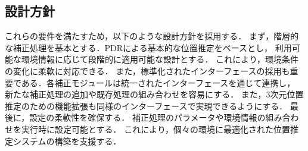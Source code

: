\subsection{設計方針}
これらの要件を満たすため，以下のような設計方針を採用する．
まず，階層的な補正処理を基本とする．PDRによる基本的な位置推定をベースとし，
利用可能な環境情報に応じて段階的に適用可能な設計とする．
これにより，環境条件の変化に柔軟に対応できる．
また，標準化されたインターフェースの採用も重要である．各補正モジュールは統一されたインターフェースを通じて連携し，
新たな補正処理の追加や既存処理の組み合わせを容易にする．
また，3次元位置推定のための機能拡張も同様のインターフェースで実現できるようにする．
最後に，設定の柔軟性を確保する．
補正処理のパラメータや環境情報の組み合わせを実行時に設定可能とする．
これにより，個々の環境に最適化された位置推定システムの構築を支援する．

